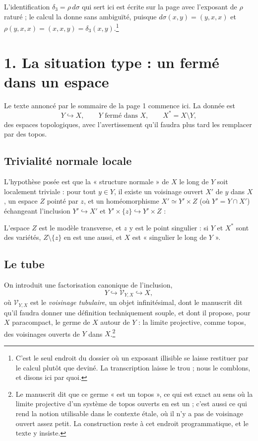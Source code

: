 \documentclass[11pt,a4paper]{article}
\begin{document}
L'identification $\delta_{3} = \rho\,d\sigma$ qui sert ici est écrite sur la
page avec l'exposant de $\rho$ raturé ; le calcul la donne sans ambiguïté,
puisque $d\sigma(x,y) = (y,x,x)$ et $\rho(y,x,x) = (x,x,y) =
\delta_{3}(x,y)$.\footnote{C'est le seul endroit du dossier où un exposant
illisible se laisse restituer par le calcul plutôt que deviné. La transcription
laisse le trou ; nous le comblons, et disons ici par quoi.}

\section*{1. La situation type : un fermé dans un espace}

Le texte annoncé par le sommaire de la page 1 commence ici. La donnée est
\[
  Y \hookrightarrow X, \qquad Y \text{ fermé dans } X,
  \qquad X^{*} = X \setminus Y,
\]
des espaces topologiques, avec l'avertissement qu'il faudra plus tard les
remplacer par des topos.

\subsection*{Trivialité normale locale}

L'hypothèse posée est que la « structure normale » de $X$ le long de $Y$ soit
localement triviale : pour tout $y \in Y$, il existe un voisinage ouvert $X'$ de
$y$ dans $X$, un espace $Z$ pointé par $z$, et un homéomorphisme
$X' \simeq Y' \times Z$ (où $Y' = Y \cap X'$) échangeant l'inclusion
$Y' \hookrightarrow X'$ et $Y' \times \{z\} \hookrightarrow Y' \times Z$ :


L'espace $Z$ est le modèle transverse, et $z$ y est le point singulier : si $Y$
et $X^{*}$ sont des variétés, $Z \setminus \{z\}$ en est une aussi, et $X$ est
« singulier le long de $Y$ ».

\subsection*{Le tube}

On introduit une factorisation canonique de l'inclusion,
\[
  Y \hookrightarrow \mathcal{V}_{Y,X} \hookrightarrow X,
\]
où $\mathcal{V}_{Y,X}$ est le \emph{voisinage tubulaire}, un objet
infinitésimal, dont le manuscrit dit qu'il faudra donner une définition
techniquement souple, et dont il propose, pour $X$ paracompact, le germe de $X$
autour de $Y$ : la limite projective, comme topos, des voisinages ouverts de $Y$
dans $X$.\footnote{Le manuscrit dit que ce germe « est un topos », ce qui est
exact au sens où la limite projective d'un système de topos ouverts en est un ;
c'est aussi ce qui rend la notion utilisable dans le contexte étale, où il n'y a
pas de voisinage ouvert assez petit. La construction reste à cet endroit
programmatique, et le texte y insiste.}
\end{document}
